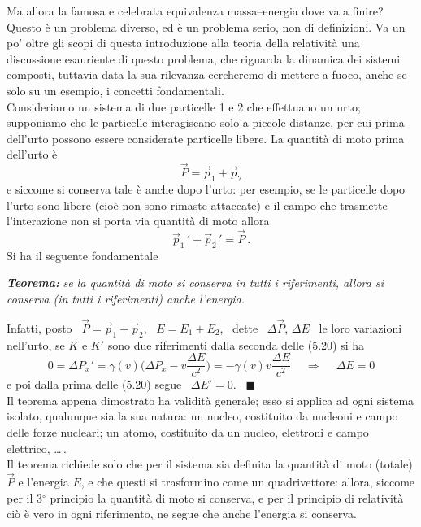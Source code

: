 Ma allora la famosa e celebrata equivalenza massa--energia dove va a finire?
Questo \`e un problema diverso, ed \`e un problema serio, non di definizioni. Va
un po' oltre gli scopi di questa introduzione alla teoria della relativit\`a una
discussione esauriente di questo problema, che riguarda la dinamica dei sistemi
composti, tuttavia data la sua rilevanza cercheremo di mettere a fuoco, anche se
solo su un esempio, i concetti fondamentali.\\
Consideriamo un sistema di due particelle 1 e 2 che effettuano un urto;
supponiamo che le particelle interagiscano solo a piccole distanze, per cui
prima dell'urto possono essere considerate particelle libere. La quantit\`a di
moto prima dell'urto \`e
\begin{equation}
  \vec P=\vec p_1+\vec p_2
  \tag{5.23}
\end{equation}
e siccome si conserva tale \`e anche dopo l'urto: per esempio, se le particelle
dopo l'urto sono libere (cio\`e non sono rimaste attaccate) e il campo che
trasmette l'interazione non si porta via quantit\`a di moto allora
\begin{equation}
  \vec p_1\,'+\vec p_2\,'=\vec P\,.
  \tag{5.24}
\end{equation}
Si ha il seguente fondamentale

\textbf{\textit{Teorema:}} \textit{se la quantit\`a di moto si conserva in tutti
i riferimenti, allora si conserva (in tutti i riferimenti) anche l'energia.}

Infatti, posto \ $\vec P=\vec p_1+\vec p_2$, \ $E=E_1+E_2$, \ dette
\ $\Delta\vec P$, $\Delta E$ \ le loro variazioni nell'urto, se $K$ e $K'$ sono
due riferimenti dalla seconda delle (5.20) si ha
\begin{equation}
  0=\Delta P_x'=\gamma(v)\Big(\Delta P_x-v\frac{\Delta E}{c^2}\Big)
  =-\gamma(v)v\frac{\Delta E}{c^2}\quad\ \Rightarrow\quad\ \Delta E=0
  \tag{5.25}
\end{equation}
e poi dalla prima delle (5.20) segue \ $\Delta E'=0$. \ $\blacksquare$\\
Il teorema appena dimostrato ha validit\`a generale; esso si applica ad ogni
sistema isolato, qualunque sia la sua natura: un nucleo, costituito da nucleoni
e campo delle forze nucleari; un atomo, costituito da un nucleo, elettroni e
campo elettrico, \dots\,.\\
Il teorema richiede solo che per il sistema sia definita la quantit\`a di moto
(totale) $\vec P$ e l'energia $E$, e che questi si trasformino come un
quadrivettore: allora, siccome per il 3$^\circ$ principio la quantit\`a di moto
si conserva, e per il principio di relativit\`a ci\`o \`e vero in ogni
riferimento, ne segue che anche l'energia si conserva.

